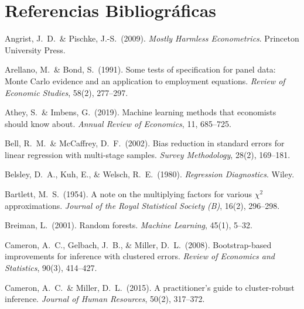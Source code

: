 \documentclass[12pt, a4paper]{article}
\theoremstyle{definition}
\begin{document}
\section*{Referencias Bibliográficas}

\begin{enumerate}[label={[\arabic*]}, leftmargin=*, itemsep=4pt]

\item Angrist, J.~D.\ \& Pischke, J.-S.\ (2009). \textit{Mostly Harmless Econometrics}. Princeton University Press.

\item Arellano, M.\ \& Bond, S.\ (1991). Some tests of specification for panel data: Monte Carlo evidence and an application to employment equations. \textit{Review of Economic Studies}, 58(2), 277--297.

\item Athey, S.\ \& Imbens, G.\ (2019). Machine learning methods that economists should know about. \textit{Annual Review of Economics}, 11, 685--725.

\item Bell, R.~M.\ \& McCaffrey, D.~F.\ (2002). Bias reduction in standard errors for linear regression with multi-stage samples. \textit{Survey Methodology}, 28(2), 169--181.

\item Belsley, D.~A., Kuh, E., \& Welsch, R.~E.\ (1980). \textit{Regression Diagnostics}. Wiley.

\item Bartlett, M.~S.\ (1954). A note on the multiplying factors for various $\chi^2$ approximations. \textit{Journal of the Royal Statistical Society (B)}, 16(2), 296--298.

\item Breiman, L.\ (2001). Random forests. \textit{Machine Learning}, 45(1), 5--32.

\item Cameron, A.~C., Gelbach, J.~B., \& Miller, D.~L.\ (2008). Bootstrap-based improvements for inference with clustered errors. \textit{Review of Economics and Statistics}, 90(3), 414--427.

\item Cameron, A.~C.\ \& Miller, D.~L.\ (2015). A practitioner's guide to cluster-robust inference. \textit{Journal of Human Resources}, 50(2), 317--372.


\end{enumerate}
\end{document}
